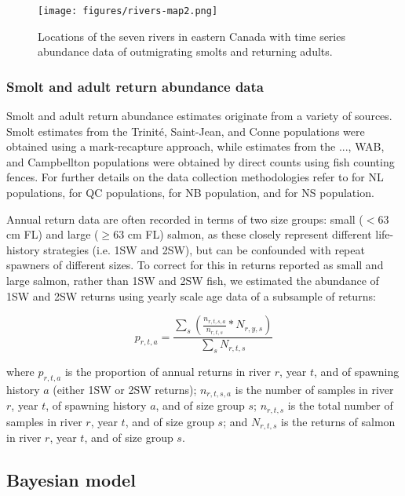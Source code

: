 \documentclass[12pt]{article}
\begin{document}
\begin{figure}[htbp] \centering
    \texttt{[image: figures/rivers-map2.png]}
    \caption{Locations of the seven rivers in eastern Canada with time series abundance data of outmigrating smolts and 
    returning adults.} \label{fig:map} 
\end{figure}

\subsubsection*{Smolt and adult return abundance data}

Smolt and adult return abundance estimates originate from a variety of
sources. Smolt estimates from the Trinit\'{e}, Saint-Jean, and Conne populations were obtained using a
mark-recapture approach, while estimates from the ..., WAB, and Campbellton populations
were obtained by direct counts using fish counting fences.
For further details on the data collection methodologies refer to 
\citet{Dempson1991, Venoitt2018} for NL populations, 
\citet{April2018}  for QC populations,
\citet{Jones2014} for NB population,
and \citet{Gibson2009} for NS population. 

Annual return data are often recorded in terms of two size groups: small ($< 63$ cm
FL) and large ($\geq 63$ cm FL) salmon, as these closely represent different
life-history strategies (i.e. 1SW and 2SW), but can be confounded with repeat
spawners of different sizes. To correct for this in returns 
reported as small and large salmon, rather than 1SW and 2SW fish, we estimated the abundance
of 1SW and 2SW returns using yearly scale age data of a subsample of returns:

\begin{equation}
    p_{r,t,a} = \frac{\sum_{s}{(\frac{n_{r,t,s,a}}{n_{r,t,s}} * N_{r,y,s})}}{\sum_{s}{N_{r,t,s}}}
\end{equation}

where $p_{r,t,a}$ is the proportion of annual returns in river $r$, year $t$,
and of spawning history $a$ (either 1SW or 2SW returns); $n_{r,t,s,a}$ is the
number of samples in river $r$, year $t$, of spawning history $a$, and of size
group $s$; $n_{r,t,s}$ is the total number of samples in river $r$, year $t$,
and of size group $s$; and $N_{r,t,s}$ is the returns of salmon
in river $r$, year $t$, and of size group $s$.

\subsection*{Bayesian model}
\end{document}
